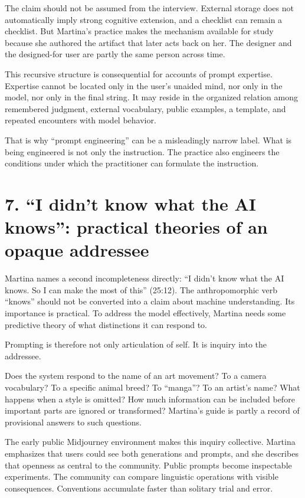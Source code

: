 \documentclass[
  11pt,
  letterpaper,
]{article}
\begin{document}
The claim should not be assumed from the interview. External storage
does not automatically imply strong cognitive extension, and a checklist
can remain a checklist. But Martina's practice makes the mechanism
available for study because she authored the artifact that later acts
back on her. The designer and the designed-for user are partly the same
person across time.

This recursive structure is consequential for accounts of prompt
expertise. Expertise cannot be located only in the user's unaided mind,
nor only in the model, nor only in the final string. It may reside in
the organized relation among remembered judgment, external vocabulary,
public examples, a template, and repeated encounters with model
behavior.

That is why ``prompt engineering'' can be a misleadingly narrow label.
What is being engineered is not only the instruction. The practice also
engineers the conditions under which the practitioner can formulate the
instruction.

\section{7. ``I didn't know what the AI knows'': practical theories of
an opaque
addressee}\label{i-didnt-know-what-the-ai-knows-practical-theories-of-an-opaque-addressee}

Martina names a second incompleteness directly: ``I didn't know what the
AI knows. So I can make the most of this'' (25:12). The anthropomorphic
verb ``knows'' should not be converted into a claim about machine
understanding. Its importance is practical. To address the model
effectively, Martina needs some predictive theory of what distinctions
it can respond to.

Prompting is therefore not only articulation of self. It is inquiry into
the addressee.

Does the system respond to the name of an art movement? To a camera
vocabulary? To a specific animal breed? To ``manga''? To an artist's
name? What happens when a style is omitted? How much information can be
included before important parts are ignored or transformed? Martina's
guide is partly a record of provisional answers to such questions.

The early public Midjourney environment makes this inquiry collective.
Martina emphasizes that users could see both generations and prompts,
and she describes that openness as central to the community. Public
prompts become inspectable experiments. The community can compare
linguistic operations with visible consequences. Conventions accumulate
faster than solitary trial and error.
\end{document}
